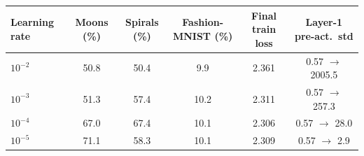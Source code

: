 \begin{tabular}{lccccc}
\toprule
Learning rate & Moons (\%) & Spirals (\%) & Fashion-MNIST (\%) & Final train loss & Layer-1 pre-act.\ std \\
\midrule
$10^{-2}$ & 50.8 & 50.4 & 9.9 & 2.361 & 0.57 $\to$ 2005.5 \\
$10^{-3}$ & 51.3 & 57.4 & 10.2 & 2.311 & 0.57 $\to$ 257.3 \\
$10^{-4}$ & 67.0 & 67.4 & 10.1 & 2.306 & 0.57 $\to$ 28.0 \\
$10^{-5}$ & 71.1 & 58.3 & 10.1 & 2.309 & 0.57 $\to$ 2.9 \\
\bottomrule
\end{tabular}
